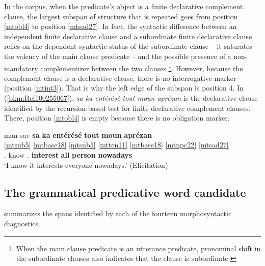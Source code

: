 \documentclass[output=paper]{langscibook}
\begin{document}
In the corpus, when the predicate’s object is a finite declarative complement clause, the largest subspan of structure that is repeated goes from position \ref{mtobl4} to position \ref{mtsad27}. In fact, the syntactic difference between an independent finite declarative clause and a subordinate finite declarative clause relies on the dependent syntactic status of the subordinate clause -- it saturates the valency of the main clause predicate -- and the possible presence of a non-mandatory complementizer between the two clauses \citep{Duzerol2021b}\footnote{When the main clause predicate is an utterance predicate, pronominal shift in the subordinate clauses also indicates that the clause is subordinate.}. However, because the complement clause is a declarative clause, there is no interrogative marker (position \ref{mtint3}). That is why the left edge of the subspan is position 4. In (\ref{bkm:Ref100255067}), \textit{sa ka entérésé tout moun aprézan} is the declarative clause identified by the recursion-based test for finite declarative complement clauses. There, position \ref{mtobl4} is empty because there is no obligation marker.

\ea\label{bkm:Ref100255067}
\glll man sav \textbf{sa} \textbf{ka} \textbf{entérésé} \textbf{tout} \textbf{moun} \textbf{aprézan}\\
\ref{mtsub5} \ref{mtbase18} \ref{mtsub5} \ref{mtten11} \ref{mtbase18} \ref{mtnpc22} {} \ref{mtsad27}\\
\First\Sg.\Sarg{} know \textbf{\Dem{}}.\textbf{\Pr{}} \textbf{\Impf{}} \textbf{interest} \textbf{all} \textbf{person} \textbf{nowadays}\\
\glt `I know it interests everyone nowadays.' (Elicitation)
\z


\subsection{The grammatical predicative word candidate}

 summarizes the spans identified by each of the fourteen morphosyntactic diagnostics.
\end{document}
